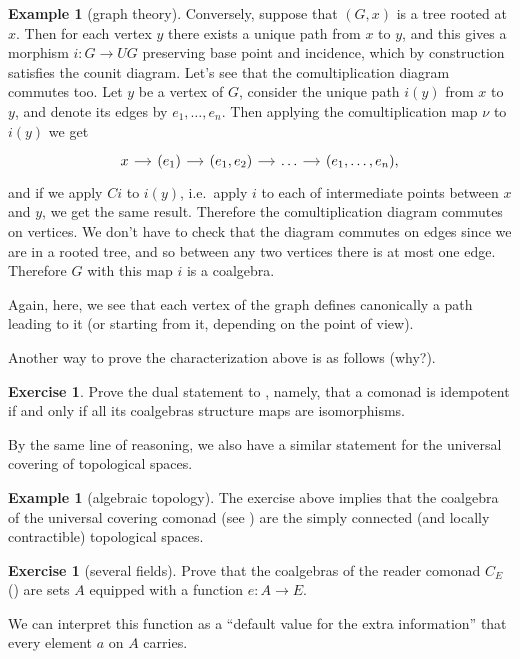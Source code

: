\documentclass[12pt,oneside]{scrbook}
\numberwithin{equation}{section}
\theoremstyle{plain}
\theoremstyle{definition}
\newtheorem{eg}[thm]{Example}
\newtheorem{ex}[thm]{Exercise}
\newcommand{\ar}[2][]{\arrow{#2}{#1}}
\DeclareMathOperator{\1}{\mathbbm{1}}
\DeclareMathOperator{\2}{\mathbbm{2}}
\begin{document}
\begin{eg}[graph theory]
 Conversely, suppose that $(G,x)$ is a tree rooted at $x$. Then for each vertex $y$ there exists a unique path from $x$ to $y$, and this gives a morphism $i:G\to UG$ preserving base point and incidence, which by construction satisfies the counit diagram. Let's see that the comultiplication diagram commutes too. Let $y$ be a vertex of $G$, consider the unique path $i(y)$ from $x$ to $y$, and denote its edges by $e_1,\dots,e_n$. Then applying the comultiplication map $\nu$ to $i(y)$ we get 
 $$
 \begin{tikzcd}[sep=small]
  x \ar{r} & (e_1) \ar{r} & (e_1,e_2) \ar{r} &\dots \ar{r} & (e_1,\dots,e_n) ,
 \end{tikzcd}
 $$
 and if we apply $Ci$ to $i(y)$, i.e.~apply $i$ to each of intermediate points between $x$ and $y$, we get the same result. Therefore the comultiplication diagram commutes on vertices.  
 We don't have to check that the diagram commutes on edges since we are in a rooted tree, and so between any two vertices there is at most one edge. Therefore $G$ with this map $i$ is a coalgebra.
\end{eg}

Again, here, we see that each vertex of the graph defines canonically a path leading to it (or starting from it, depending on the point of view).


Another way to prove the characterization above is as follows (why?).

\begin{ex}
 Prove the dual statement to , namely, that a comonad is idempotent if and only if all its coalgebras structure maps are isomorphisms. 
\end{ex}

By the same line of reasoning, we also have a similar statement for the universal covering of topological spaces.

\begin{eg}[algebraic topology]
 The exercise above implies that the coalgebra of the universal covering comonad (see ) are the simply connected (and locally contractible) topological spaces. 
\end{eg}


\begin{ex}[several fields]
 Prove that the coalgebras of the reader comonad $C_E$ () are sets $A$ equipped with a function $e:A\to E$. 
 
 We can interpret this function as a ``default value for the extra information'' that every element $a$ on $A$ carries.
\end{ex}
\end{document}
